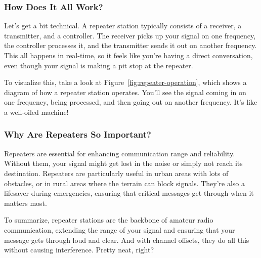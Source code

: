 \subsubsection*{How Does It All Work?}

Let’s get a bit technical. A repeater station typically consists of a receiver, a transmitter, and a controller. The receiver picks up your signal on one frequency, the controller processes it, and the transmitter sends it out on another frequency. This all happens in real-time, so it feels like you’re having a direct conversation, even though your signal is making a pit stop at the repeater.

To visualize this, take a look at Figure~\ref{fig:repeater-operation}, which shows a diagram of how a repeater station operates. You’ll see the signal coming in on one frequency, being processed, and then going out on another frequency. It’s like a well-oiled machine!

\subsubsection*{Why Are Repeaters So Important?}

Repeaters are essential for enhancing communication range and reliability. Without them, your signal might get lost in the noise or simply not reach its destination. Repeaters are particularly useful in urban areas with lots of obstacles, or in rural areas where the terrain can block signals. They’re also a lifesaver during emergencies, ensuring that critical messages get through when it matters most.

To summarize, repeater stations are the backbone of amateur radio communication, extending the range of your signal and ensuring that your message gets through loud and clear. And with channel offsets, they do all this without causing interference. Pretty neat, right?



